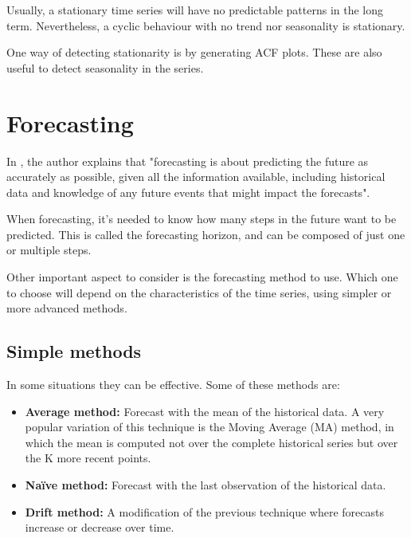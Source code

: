 Usually, a stationary time series will have no predictable patterns in the long term. Nevertheless, a cyclic behaviour with no trend nor seasonality is stationary.

One way of detecting stationarity is by generating ACF plots. These are also useful to detect seasonality in the series. \cite{hyndman2018forecasting}


\section{Forecasting}
In \cite{hyndman2018forecasting}, the author explains that "forecasting is about predicting the future as accurately as possible, given all the information available, including historical data and knowledge of any future events that might impact the forecasts".

When forecasting, it's needed to know how many steps in the future want to be predicted. This is called the forecasting horizon, and can be composed of just one or multiple steps.

Other important aspect to consider is the forecasting method to use. Which one to choose will depend on the characteristics of the time series, using simpler or more advanced methods.


\subsection{Simple methods}
In some situations they can be effective. Some of these methods are: \cite{hyndman2018forecasting}
\begin{itemize}
    \item \textbf{Average method:} Forecast with the mean of the historical data. A very popular variation of this technique is the Moving Average (MA) method, in which the mean is computed not over the complete historical series but over the K more recent points.
    \item \textbf{Naïve method:} Forecast with the last observation of the historical data.
    \item \textbf{Drift method:} A modification of the previous technique where forecasts increase or decrease over time.
\end{itemize}

